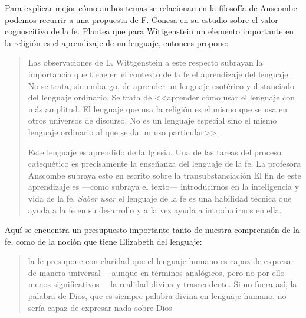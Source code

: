Para explicar mejor cómo ambos temas se relacionan en la filosofía de Anscombe podemos recurrir a una propuesta de F. Conesa en su estudio sobre el valor cognoscitivo de la fe. Plantea que para Wittgenstein un elemento importante en la religión es el aprendizaje de un lenguaje, entonces propone: \blockquote[{\Cite[310-311]{conesa1994cc}}]{Las observaciones de L. Wittgenstein a este respecto subrayan la importancia que tiene en el contexto de la fe el aprendizaje del lenguaje. No se trata, sin embargo, de aprender un lenguaje esotérico y distanciado del lenguaje ordinario. Se trata de <<aprender cómo usar el lenguaje con más amplitud. El lenguaje que usa la religión es el mismo que se usa en otros universos de discurso. No es un lenguaje especial sino el mismo lenguaje ordinario al que se da un uso particular>>.

Este lenguaje es aprendido de la Iglesia. Una de las tareas del proceso catequético es precisamente la enseñanza del lenguaje de la fe. La profesora Anscombe subraya esto en  escrito sobre la transubstanciación
  \textelp{} El fin de este aprendizaje es ---como subraya el texto--- introducirnos en la inteligencia y vida de la fe. \emph{Saber usar} el lenguaje de la fe es una habilidad técnica que ayuda a la fe en su desarrollo y a la vez ayuda a introducirnos en ella.}

Aquí se encuentra un presupuesto importante tanto de nuestra comprensión de la fe, como de la noción que tiene Elizabeth del lenguaje: \blockquote[][\,(FR 84)]{la fe presupone con claridad que el lenguaje humano es capaz de expresar de manera universal ---aunque en términos analógicos, pero no por ello menos significativos--- la realidad divina y trascendente. Si no fuera así, la palabra de Dios, que es siempre palabra divina en lenguaje humano, no sería capaz de expresar nada sobre Dios}. 

